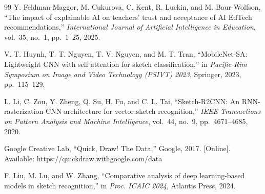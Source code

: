 \begin{thebibliography}{99}
Y. Feldman-Maggor, M. Cukurova, C. Kent, R. Luckin, and M. Baur-Wolfson, ``The impact of explainable AI on teachers' trust and acceptance of AI EdTech recommendations,'' \textit{International Journal of Artificial Intelligence in Education}, vol.~35, no.~1, pp.~1--25, 2025.

V. T. Huynh, T. T. Nguyen, T. V. Nguyen, and M. T. Tran, ``MobileNet-SA: Lightweight CNN with self attention for sketch classification,'' in \textit{Pacific-Rim Symposium on Image and Video Technology (PSIVT) 2023}, Springer, 2023, pp.~115--129.

L. Li, C. Zou, Y. Zheng, Q. Su, H. Fu, and C. L. Tai, ``Sketch-R2CNN: An RNN-rasterization-CNN architecture for vector sketch recognition,'' \textit{IEEE Transactions on Pattern Analysis and Machine Intelligence}, vol.~44, no.~9, pp.~4671--4685, 2020.

Google Creative Lab, ``Quick, Draw! The Data,'' Google, 2017. [Online]. Available: https://quickdraw.withgoogle.com/data

F. Liu, M. Lu, and W. Zhang, ``Comparative analysis of deep learning-based models in sketch recognition,'' in \textit{Proc. ICAIC 2024}, Atlantis Press, 2024.

\end{thebibliography}
